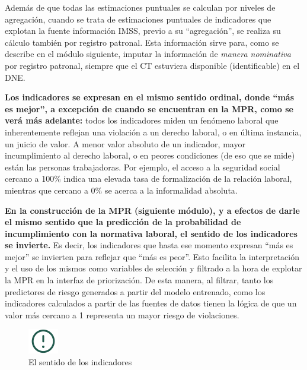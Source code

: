 \documentclass[
]{article}
\begin{document}
Además de que todas las estimaciones puntuales se calculan por niveles de agregación, cuando se trata de estimaciones puntuales de indicadores que explotan la fuente información IMSS, previo a su ``agregación'', se realiza su cálculo también por registro patronal. Esta información sirve para, como se describe en el módulo siguiente, imputar la información de \emph{manera nominativa} por registro patronal, siempre que el CT estuviera disponible (identificable) en el DNE.

\textbf{Los indicadores se expresan en el mismo sentido ordinal, donde ``más es mejor'', a excepción de cuando se encuentran en la MPR, como se verá más adelante:} todos los indicadores miden un fenómeno laboral que inherentemente reflejan una violación a un derecho laboral, o en última instancia, un juicio de valor. A menor valor absoluto de un indicador, mayor incumplimiento al derecho laboral, o en peores condiciones (de eso que se mide) están las personas trabajadoras. Por ejemplo, el acceso a la seguridad social cercano a 100\% indica una elevada tasa de formalización de la relación laboral, mientras que cercano a 0\% se acerca a la informalidad absoluta.

\textbf{En la construcción de la MPR (siguiente módulo), y a efectos de darle el mismo sentido que la predicción de la probabilidad de incumplimiento con la normativa laboral, el sentido de los indicadores se invierte.} Es decir, los indicadores que hasta ese momento expresan ``más es mejor'' se invierten para reflejar que ``más es peor''. Esto facilita la interpretación y el uso de los mismos como variables de selección y filtrado a la hora de explotar la MPR en la interfaz de priorización. De esta manera, al filtrar, tanto los predictores de riesgo generados a partir del modelo entrenado, como los indicadores calculados a partir de las fuentes de datos tienen la lógica de que un valor más cercano a 1 representa un mayor riesgo de violaciones.

\begin{figure}
\includegraphics[width=50px,style="float:left; background-color: #fff; padding-right:1em"]{images-1/important-icon} \caption{El sentido de los indicadores}\label{fig:sentidoindicadores}
\end{figure}
\end{document}
